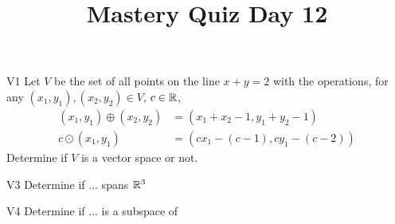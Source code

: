 \documentclass{sbgLAquiz}
\title{Mastery Quiz Day 12 }
\begin{document}
\begin{problem}{V1}
Let $V$ be the set of all points on the line $x+y=2$ with the operations, for any $(x_1,y_1), (x_2,y_2) \in V$, $c \in \mathbb{R}$,
\begin{align*}
(x_1,y_1) \oplus (x_2,y_2) &= (x_1+x_2-1,y_1+y_2-1) \\
c \odot (x_1,y_1) &= (cx_1-(c-1), cy_1-(c-2))
\end{align*}
Determine if $V$ is a vector space or not.
\end{problem}

\begin{problem}{V3}
Determine if ... spans $\mathbb{R}^3$
\end{problem}
\newpage

\begin{problem}{V4}
Determine if ... is a subspace of
\end{problem}
\end{document}
